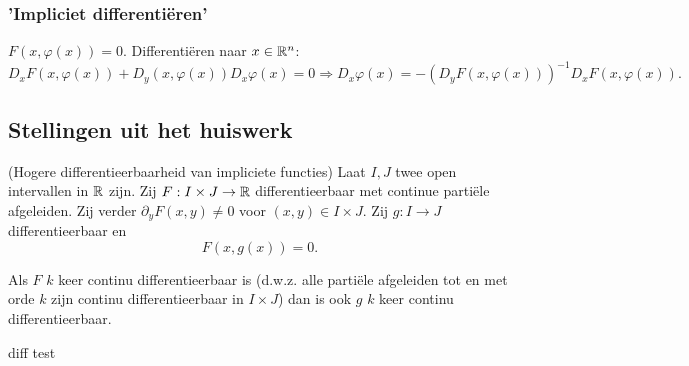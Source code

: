 \documentclass{2wa40summary}
\begin{document}
			\subsubsection{'Impliciet differenti\"eren'}
				$ F(x,\varphi(x))=0 $. Differenti\"eren naar $ x\in \mathbb{R}^n $:
				\[ D_x F(x,\varphi(x)) + D_y (x,\varphi(x))D_x \varphi(x) = 0 \Rightarrow D_x \varphi(x) = -(D_y F(x,\varphi(x)))^{-1} D_x F(x,\varphi(x)). \]
				
		\subsection{Stellingen uit het huiswerk}
			\theorem (Hogere differentieerbaarheid van impliciete functies)
				Laat $I,J$ twee open intervallen in $ \mathbb{R} $ zijn. Zij $F:I \times J \to \mathbb{R}$ differentieerbaar met continue parti\"ele afgeleiden. Zij verder $\partial_y F(x,y) \neq 0$ voor $(x,y) \in I \times J$. Zij $g:I\to J$ differentieerbaar en \[ F(x,g(x)) = 0. \]
				
				Als $F$ $k$ keer continu differentieerbaar is (d.w.z. alle parti\"ele afgeleiden tot en met orde $k$ zijn continu differentieerbaar in $I \times J$) dan is ook $g$ $k$ keer continu differentieerbaar.		
				
				diff test
					
		
		
\end{document}
